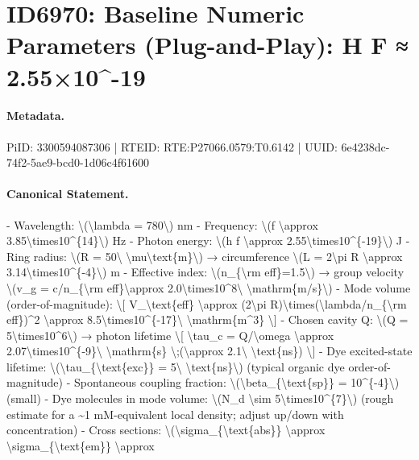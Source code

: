 \section*{ID6970: Baseline Numeric Parameters (Plug-and-Play): H F ≈ 2.55×10\textasciicircum{}-19}
\paragraph{Metadata.}
PiID: 3300594087306 | RTEID: RTE:P27066.0579:T0.6142 | UUID: 6e4238dc-74f2-5ae9-bcd0-1d06c4f61600

\paragraph{Canonical Statement.}
- Wavelength: \textbackslash{}(\textbackslash{}lambda = 780\textbackslash{}) nm - Frequency: \textbackslash{}(f \textbackslash{}approx 3.85\textbackslash{}times10\textasciicircum{}\{14\}\textbackslash{}) Hz - Photon energy: \textbackslash{}(h f \textbackslash{}approx 2.55\textbackslash{}times10\textasciicircum{}\{-19\}\textbackslash{}) J - Ring radius: \textbackslash{}(R = 50\textbackslash{} \textbackslash{}mu\textbackslash{}text\{m\}\textbackslash{}) → circumference \textbackslash{}(L = 2\textbackslash{}pi R \textbackslash{}approx 3.14\textbackslash{}times10\textasciicircum{}\{-4\}\textbackslash{}) m - Effective index: \textbackslash{}(n\_\{\textbackslash{}rm eff\}=1.5\textbackslash{}) → group velocity \textbackslash{}(v\_g = c/n\_\{\textbackslash{}rm eff\}\textbackslash{}approx 2.0\textbackslash{}times10\textasciicircum{}8\textbackslash{} \textbackslash{}mathrm\{m/s\}\textbackslash{}) - Mode volume (order-of-magnitude): \textbackslash{}[ V\_\textbackslash{}text\{eff\} \textbackslash{}approx (2\textbackslash{}pi R)\textbackslash{}times(\textbackslash{}lambda/n\_\{\textbackslash{}rm eff\})\textasciicircum{}2 \textbackslash{}approx 8.5\textbackslash{}times10\textasciicircum{}\{-17\}\textbackslash{} \textbackslash{}mathrm\{m\textasciicircum{}3\} \textbackslash{}] - Chosen cavity Q: \textbackslash{}(Q = 5\textbackslash{}times10\textasciicircum{}6\textbackslash{}) → photon lifetime \textbackslash{}[ \textbackslash{}tau\_c = Q/\textbackslash{}omega \textbackslash{}approx 2.07\textbackslash{}times10\textasciicircum{}\{-9\}\textbackslash{} \textbackslash{}mathrm\{s\} \textbackslash{};(\textbackslash{}approx 2.1\textbackslash{} \textbackslash{}text\{ns\}) \textbackslash{}] - Dye excited-state lifetime: \textbackslash{}(\textbackslash{}tau\_\{\textbackslash{}text\{exc\}\} = 5\textbackslash{} \textbackslash{}text\{ns\}\textbackslash{}) (typical organic dye order-of-magnitude) - Spontaneous coupling fraction: \textbackslash{}(\textbackslash{}beta\_\{\textbackslash{}text\{sp\}\} = 10\textasciicircum{}\{-4\}\textbackslash{}) (small) - Dye molecules in mode volume: \textbackslash{}(N\_d \textbackslash{}sim 5\textbackslash{}times10\textasciicircum{}\{7\}\textbackslash{}) (rough estimate for a \textasciitilde{}1 mM-equivalent local density; adjust up/down with concentration) - Cross sections: \textbackslash{}(\textbackslash{}sigma\_\{\textbackslash{}text\{abs\}\} \textbackslash{}approx \textbackslash{}sigma\_\{\textbackslash{}text\{em\}\} \textbackslash{}approx 